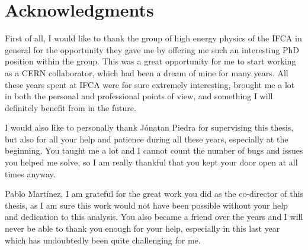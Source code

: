 \documentclass[a4paper, 10pt, openright]{report}
\begin{document}

\setlength{\parskip}{5pt}
\setcounter{page}{1}

%

\chapter*{Acknowledgments}

First of all, I would like to thank the group of high energy physics of the \ac{IFCA} in general for the opportunity they gave me by offering me such an interesting PhD position within the group. This was a great opportunity for me to start working as a CERN collaborator, which had been a dream of mine for many years. All these years spent at \ac{IFCA} were for sure extremely interesting, brought me a lot in both the personal and professional points of view, and something I will definitely benefit from in the future.

I would also like to personally thank J\'{o}natan Piedra for supervising this thesis, but also for all your help and patience during all these years, especially at the beginning. You taught me a lot and I cannot count the number of bugs and issues you helped me solve, so I am really thankful that you kept your door open at all times anyway.

Pablo Mart\'{i}nez, I am grateful for the great work you did as the co-director of this thesis, as I am sure this work would not have been possible without your help and dedication to this analysis. You also became a friend over the years and I will never be able to thank you enough for your help, especially in this last year which has undoubtedly been quite challenging for me. 
\end{document}
